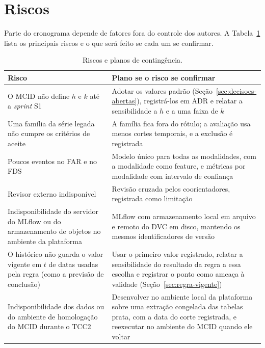 \section{Riscos}

Parte do cronograma depende de fatores fora do controle dos autores. A Tabela~\ref{tab:riscos} lista os principais riscos e o que será feito se cada um se confirmar.

\begin{table}[htbp]
	\centering
	\caption{Riscos e planos de contingência.}
	\label{tab:riscos}
	\small
	\begin{tabularx}{\textwidth}{@{}>{\raggedright\arraybackslash}p{4.6cm}>{\raggedright\arraybackslash}X@{}}
		\toprule
		\textbf{Risco} & \textbf{Plano se o risco se confirmar} \\
		\midrule
		O MCID não define $h$ e $k$ até a \textit{sprint} S1 & Adotar os valores padrão (Seção~\ref{sec:decisoes-abertas}), registrá-los em ADR e relatar a sensibilidade a $h$ e a uma faixa de $k$ \\ \addlinespace
		Uma família da série legada não cumpre os critérios de aceite & A família fica fora do rótulo; a avaliação usa menos cortes temporais, e a exclusão é registrada \\ \addlinespace
		Poucos eventos no FAR e no FDS & Modelo único para todas as modalidades, com a modalidade como feature, e métricas por modalidade com intervalo de confiança \\ \addlinespace
		Revisor externo indisponível & Revisão cruzada pelos coorientadores, registrada como limitação \\ \addlinespace
		Indisponibilidade do servidor do MLflow ou do armazenamento de objetos no ambiente da plataforma & MLflow com armazenamento local em arquivo e remoto do DVC em disco, mantendo os mesmos identificadores de versão \\ \addlinespace
		O histórico não guarda o valor vigente em $t$ de datas usadas pela regra (como a previsão de conclusão) & Usar o primeiro valor registrado, relatar a sensibilidade do resultado da regra a essa escolha e registrar o ponto como ameaça à validade (Seção~\ref{sec:regra-vigente}) \\ \addlinespace
		Indisponibilidade dos dados ou do ambiente de homologação do MCID durante o TCC2 & Desenvolver no ambiente local da plataforma sobre uma extração congelada das tabelas prata, com a data do corte registrada, e reexecutar no ambiente do MCID quando ele voltar \\
		\bottomrule
	\end{tabularx}
\end{table}
